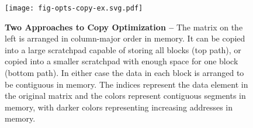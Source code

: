 
\begin{figure}[b]

  \centering
  \texttt{[image: fig-opts-copy-ex.svg.pdf]}

  \caption{\textbf{Two Approaches to Copy Optimization --} The matrix on
    the left is arranged in column-major order in memory. It can be
    copied into a large scratchpad capable of storing all blocks (top
    path), or copied into a smaller scratchpad with enough space for one
    block (bottom path). In either case the data in each block is
    arranged to be contiguous in memory. The indices represent the data
    element in the original matrix and the colors represent contiguous
    segments in memory, with darker colors representing increasing
    addresses in memory.}

  \label{fig-opts-copy-ex}

\end{figure}
